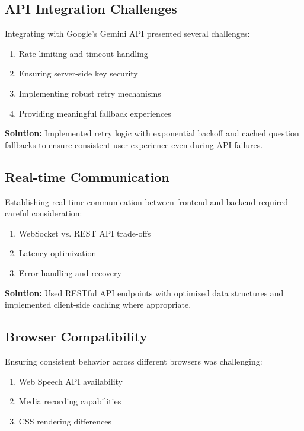 \documentclass[12pt, conference]{IEEEtran}
\begin{document}
\subsection{API Integration Challenges}

Integrating with Google's Gemini API presented several challenges:
\begin{enumerate}
    \item Rate limiting and timeout handling
    \item Ensuring server-side key security
    \item Implementing robust retry mechanisms
    \item Providing meaningful fallback experiences
\end{enumerate}

\noindent\textbf{Solution:} Implemented retry logic with exponential backoff and cached question fallbacks to ensure consistent user experience even during API failures.

\subsection{Real-time Communication}

Establishing real-time communication between frontend and backend required careful consideration:
\begin{enumerate}
    \item WebSocket vs. REST API trade-offs
    \item Latency optimization
    \item Error handling and recovery
\end{enumerate}

\noindent\textbf{Solution:} Used RESTful API endpoints with optimized data structures and implemented client-side caching where appropriate.

\subsection{Browser Compatibility}

Ensuring consistent behavior across different browsers was challenging:
\begin{enumerate}
    \item Web Speech API availability
    \item Media recording capabilities
    \item CSS rendering differences
\end{enumerate}
\end{document}
